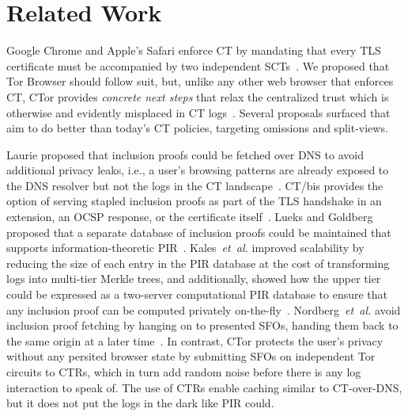 \section{Related Work} \label{sec:related}
Google Chrome and Apple's Safari enforce CT by mandating that every TLS
certificate must be accompanied by two independent
SCTs~\cite{chrome-policy,safari-policy}.  We proposed that Tor Browser should
follow suit, but, unlike any other web browser that enforces CT, CTor provides
\emph{concrete next steps} that relax the centralized trust which is otherwise
and evidently misplaced in CT logs~\cite{%
	izenpe-disqualified,%
	venafi-disqualified,%
	gdca1-omission,%
	digicert-log-compromised%
}.  Several proposals surfaced that aim to do better than today's CT
policies, targeting omissions and split-views.

Laurie proposed that inclusion proofs could be fetched over DNS to avoid
additional privacy leaks, i.e., a user's browsing patterns are already exposed
to the DNS resolver but not the logs in the CT landscape~\cite{ct-over-dns}.
CT/bis provides the option of serving stapled inclusion proofs as part of the
TLS handshake in an extension, an OCSP response, or the certificate
itself~\cite{ct/bis}.
Lueks and Goldberg proposed that a separate database of inclusion proofs could
be maintained that supports information-theoretic PIR~\cite{lueks-and-goldberg}.
Kales~\emph{et~al.} improved scalability by reducing the size of each entry
in the PIR database at the cost of transforming logs into multi-tier Merkle
trees, and additionally, showed how the upper tier could be expressed as
a two-server computational PIR database to ensure that any inclusion proof can
be computed privately on-the-fly~\cite{kales}.
Nordberg~\emph{et~al.} avoid inclusion proof fetching by hanging on to presented
SFOs, handing them back to the same origin at a later time~\cite{nordberg}.
In contrast, CTor protects the user's privacy without any persited browser state
by submitting SFOs on independent Tor circuits to CTRs, which in turn add random
noise before there is any log interaction to speak of.  The use of CTRs
enable caching similar to CT-over-DNS, but it does not put the logs in the dark
like PIR could.

